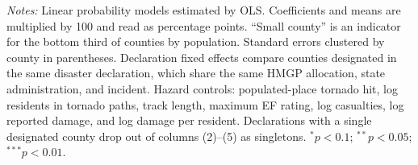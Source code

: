 \begin{table}[!htbp]
\begin{threeparttable}
\begin{tablenotes}[flushleft]
\item \textit{Notes:} Linear probability models estimated by OLS. Coefficients and means are multiplied by 100 and read as percentage points. ``Small county'' is an indicator for the bottom third of counties by population. Standard errors clustered by county in parentheses. Declaration fixed effects compare counties designated in the same disaster declaration, which share the same HMGP allocation, state administration, and incident. Hazard controls: populated-place tornado hit, log residents in tornado paths, track length, maximum EF rating, log casualties, log reported damage, and log damage per resident. Declarations with a single designated county drop out of columns (2)--(5) as singletons. $^{*}p<0.1$; $^{**}p<0.05$; $^{***}p<0.01$.
\end{tablenotes}
\end{threeparttable}
\end{table}
